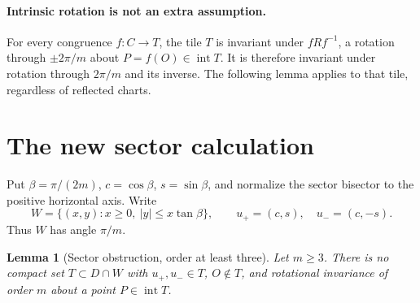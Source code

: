 \documentclass[11pt]{article}
\newtheorem{lemma}[theorem]{Lemma}
\newcommand{\interior}{\operatorname{int}}
\begin{document}
\paragraph{Intrinsic rotation is not an extra assumption.}
For every congruence $f:C\to T$, the tile $T$ is invariant under $fRf^{-1}$,
a rotation through $\pm2\pi/m$ about $P=f(O)\in\interior T$.
It is therefore invariant under rotation through $2\pi/m$ and its inverse.
The following lemma applies to that tile, regardless of reflected charts.

\section{The new sector calculation}

Put $\beta=\pi/(2m)$, $c=\cos\beta$, $s=\sin\beta$, and normalize the
sector bisector to the positive horizontal axis. Write
\[
 W=\{(x,y):x\geq0,\ |y|\leq x\tan\beta\},\qquad
 u_+=(c,s),\quad u_-=(c,-s).
\]
Thus $W$ has angle $\pi/m$.

\begin{lemma}[Sector obstruction, order at least three]\label{lem:sector}
Let $m\geq3$. There is no compact set $T\subset D\cap W$ with
$u_+,u_-\in T$, $O\notin T$, and rotational invariance of order $m$
about a point $P\in\interior T$.
\end{lemma}
\end{document}
